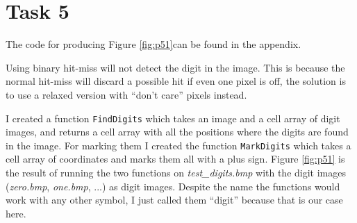 \section{Task 5}
The code for producing Figure \ref{fig:p51}can be found in the appendix.

Using binary hit-miss will not detect the digit in the image. This is because the normal hit-miss will
discard a possible hit if even one pixel is off, the solution is to use a relaxed version with
``don't care'' pixels instead.


I created a function \texttt{FindDigits} which takes an image and a cell array of digit images, and returns a cell array with all the positions where the digits are found in the image.
For marking them I created the function \texttt{MarkDigits} which takes a cell array of coordinates and marks them all with a plus sign. Figure \ref{fig:p51} is the result
of running the two functions on \textit{test_digits.bmp} with the digit images (\textit{zero.bmp}, \textit{one.bmp}, ...) as digit images.
Despite the name the functions would work with any other symbol, I just called them ``digit'' because that is our case here.